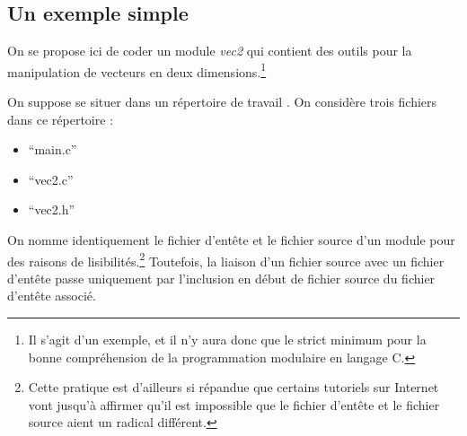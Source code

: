 \documentclass[../../../main.tex]{subfiles}
\begin{document}
\subsection{Un exemple simple}
\label{sub:un_exemple_simple}
On se propose ici de coder un module \textit{vec2} qui contient des outils pour la manipulation de vecteurs en deux dimensions.\footnote{Il s'agit d'un exemple, et il n'y aura donc que le strict minimum pour la bonne compréhension de la programmation modulaire en langage C.}
 
On suppose se situer dans un répertoire de travail . On considère trois fichiers dans ce répertoire :
\begin{itemize}
	\item ``main.c''
	\item ``vec2.c''
	\item ``vec2.h''
\end{itemize}
On nomme identiquement le fichier d'entête et le fichier source d'un module pour des raisons de lisibilités.\footnote{Cette pratique est d'ailleurs si répandue que certains tutoriels sur Internet vont jusqu'à affirmer qu'il est impossible que le fichier d'entête et le fichier source aient un radical différent.} Toutefois, la liaison d'un fichier source avec un fichier d'entête passe uniquement par l'inclusion en début de fichier source du fichier d'entête associé.
 
\end{document}
